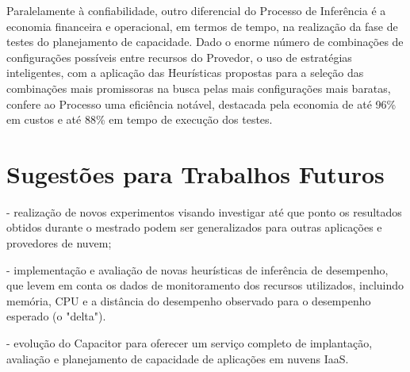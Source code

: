 Paralelamente à confiabilidade, outro diferencial do Processo de Inferência é a 
economia financeira e operacional, em termos de tempo, na realização da fase de 
testes do planejamento de capacidade. Dado o enorme número de combinações de 
configurações possíveis entre recursos do Provedor, o uso de estratégias inteligentes,
com a aplicação das Heurísticas propostas para a seleção das combinações mais 
promissoras na busca pelas mais configurações mais baratas, confere ao Processo 
uma eficiência notável, destacada pela economia de até 96\% em custos e até 88\% 
em tempo de execução dos testes.  
  
\section{Sugestões para Trabalhos Futuros}
- realização de novos experimentos visando investigar até que ponto os resultados obtidos durante o mestrado podem ser generalizados para outras aplicações e provedores de nuvem;

- implementação e avaliação de novas heurísticas de inferência de desempenho, que levem em conta os dados de monitoramento dos recursos utilizados, incluindo memória, CPU e a distância do desempenho observado para o desempenho esperado (o "delta").

-  evolução do Capacitor para oferecer um serviço completo de implantação, avaliação e planejamento de capacidade de aplicações em nuvens IaaS.

